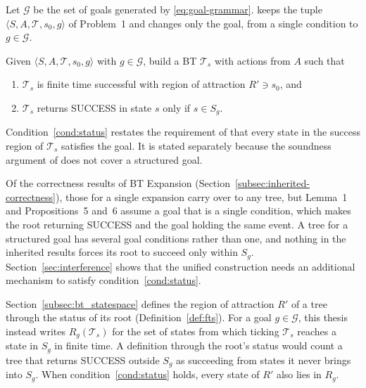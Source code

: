     Let $\mathcal{G}$ be the set of goals generated by \eqref{eq:goal-grammar}.
    \probprime keeps the tuple $\langle S, A, \mathcal{T}, s_0, g \rangle$ of Problem~1 and changes only the goal, from a single condition to $g \in \mathcal{G}$.
    \begin{problemprime}
        Given $\langle S, A, \mathcal{T}, s_0, g \rangle$ with $g \in \mathcal{G}$, build a BT $\mathcal{T}_s$ with actions from $A$ such that
        \begin{enumerate}[label=(\roman*)]
            \item $\mathcal{T}_s$ is finite time successful with region of attraction $R' \ni s_0$, and \label{cond:fts}
            \item $\mathcal{T}_s$ returns SUCCESS in state $s$ only if $s \in S_g$. \label{cond:status}
        \end{enumerate}
    \end{problemprime}

    Condition~\ref{cond:status} restates the requirement of \probone that every state in the success region of $\mathcal{T}_s$ satisfies the goal.
    It is stated separately because the soundness argument of \cite{cai2021} does not cover a structured goal.
    
    \label{subsec:inherited-scope}
    Of the correctness results of BT Expansion (Section~\ref{subsec:inherited-correctness}), those for a single expansion carry over to any tree, but Lemma~1 and Propositions~5 and~6 assume a goal that is a single condition, which makes the root returning SUCCESS and the goal holding the same event.
    A tree for a structured goal has several goal conditions rather than one, and nothing in the inherited results forces its root to succeed only within $S_g$.
    Section~\ref{sec:interference} shows that the unified construction needs an additional mechanism to satisfy condition~\ref{cond:status}.

    Section~\ref{subsec:bt_statespace} defines the region of attraction $R'$ of a tree through the status of its root (Definition~\ref{def:fts}).
    For a goal $g \in \mathcal{G}$, this thesis instead writes $R_g(\mathcal{T}_s)$ for the set of states from which ticking $\mathcal{T}_s$ reaches a state in $S_g$ in finite time.
    A definition through the root's status would count a tree that returns SUCCESS outside $S_g$ as succeeding from states it never brings into $S_g$.
    When condition~\ref{cond:status} holds, every state of $R'$ also lies in $R_g$.
    
